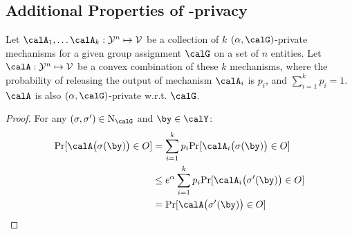 \subsection{ Additional Properties of \name-privacy} \label{app:post-processing}

\begin{lemma}[Convexity] \label{lem:convexity}
Let $\calA_1, \dots \calA_k: \mathcal{Y}^n \mapsto \mathcal{V}$ be a collection of $k$ $(\alpha,\calG)$-\name private mechanisms for a given group assignment $\calG$ on a set of $n$ entities. Let $\calA: \mathcal{Y}^n \mapsto \mathcal{V}$ be a convex combination of these $k$ mechanisms, where the probability of releasing the output of mechanism $\calA_i$ is $p_i$, and $\sum_{i=1}^k p_i = 1$. $\calA$ is also $(\alpha,\calG)$-\name private w.r.t. $\calG$. 
\end{lemma}
\begin{proof}
For any $(\sigma, \sigma') \in \mathrm{N}_\calG$ and $\by \in \calY$: 
\begin{align*}
    \mathrm{Pr} [\calA \big( \sigma( \by) \big) \in O]
    &= \sum_{i=1}^k p_i \mathrm{Pr} [\calA_i \big( \sigma( \by) \big) \in O] \\
    &\leq e^\alpha \sum_{i=1}^k p_i \mathrm{Pr} [\calA_i \big( \sigma'( \by) \big) \in O] \\
    &=  \mathrm{Pr} [\calA \big( \sigma'( \by) \big) \in O]
\end{align*}
\end{proof}


